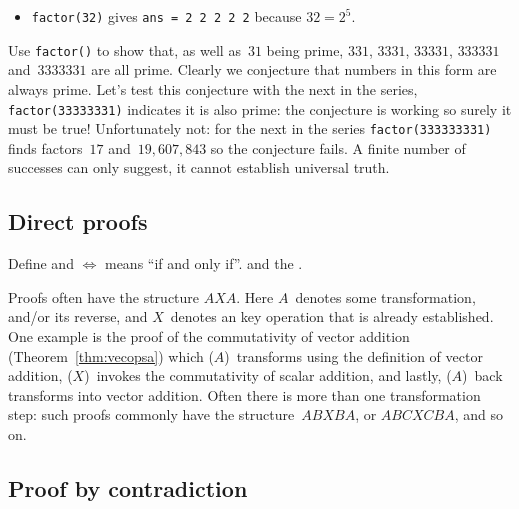 \begin{draft}
\begin{example}
\begin{itemize}
\item \verb|factor(32)| gives \verb|ans = 2 2 2 2 2| because \(32=2^5\).
\end{itemize}
Use \verb|factor()| to show that, as well as~\(31\) being prime, \(331\), \(3331\), \(33331\), \(333331\) and~\(3333331\) are all prime.
Clearly we conjecture that numbers in this form are always prime.
Let's test this conjecture with the next in the series, \verb|factor(33333331)| indicates it is also prime: the conjecture is working so surely it must be true!
Unfortunately not: for the next in the series \verb|factor(333333331)| finds factors~\(17\) and~\(19,607,843\) so the conjecture fails.
A finite number of successes can only suggest, it cannot establish universal truth.
\end{example}









\subsection{Direct proofs}
\label{sec:dp}

\begin{comment}
Currently I only use ``iff'' from \S\ref{sec:iee} and thereafter.
Need to check on \(\iff\) use.
\end{comment}
Define  and \(\iff\) means ``if and only if''.
and the .

Proofs often have the structure \(AXA\).
Here \(A\)~denotes some transformation, and/or its reverse, and \(X\)~denotes an key operation that is already established.
One example is the proof of the commutativity of vector addition (Theorem~\ref{thm:vecopsa}) which (\(A\))~transforms using the definition of vector addition,  (\(X\))~invokes the commutativity of scalar addition, and lastly, (\(A\))~back transforms into vector addition.
Often there is more than one transformation step: such proofs commonly have the structure~\(ABXBA\), or \(ABCXCBA\), and so on.



\begin{comment}
SEbooklet.pdf has a couple of examples, and a possible approach to describe in understanding proofs.
\end{comment}



\subsection{Proof by contradiction}
\label{sec:pc}


\end{draft}

